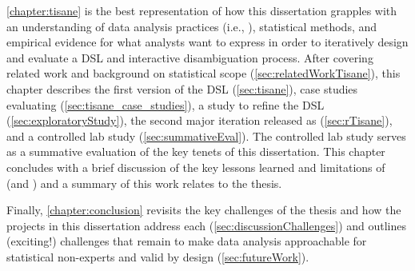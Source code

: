 \autoref{chapter:tisane} is the best representation of how this dissertation
grapples with an understanding of data analysis practices (i.e., \hypoForm),
statistical methods, and empirical evidence for what analysts want to express in
order to iteratively design and evaluate a DSL and interactive disambiguation
process. After covering related work and background on statistical scope
(\autoref{sec:relatedWorkTisane}), this chapter describes the first version of
the \tisane DSL (\autoref{sec:tisane}), case studies evaluating \tisane
(\autoref{sec:tisane_case_studies}), a study to refine the DSL
(\autoref{sec:exploratoryStudy}), the second major iteration released as
\rTisane (\autoref{sec:rTisane}), and a controlled lab study
(\autoref{sec:summativeEval}). The controlled lab study serves as a summative
evaluation of the key tenets of this dissertation. This chapter concludes with a
brief discussion of the key lessons learned and limitations of \tisane (and
\rTisane) and a summary of this work relates to the thesis. 

Finally, \autoref{chapter:conclusion} revisits the key challenges of the thesis
and how the projects in this dissertation address each
(\autoref{sec:discussionChallenges}) and outlines
(exciting!) challenges that remain to make data analysis approachable for
statistical non-experts and valid by design (\autoref{sec:futureWork}). 


\begin{comment}
\todo{Fill in this outline}

\section*{How to approach this dissertation} \todo{Decide if want to keep}

\section{Prior Publication and Authorship} \todo{fill in}
\end{comment}